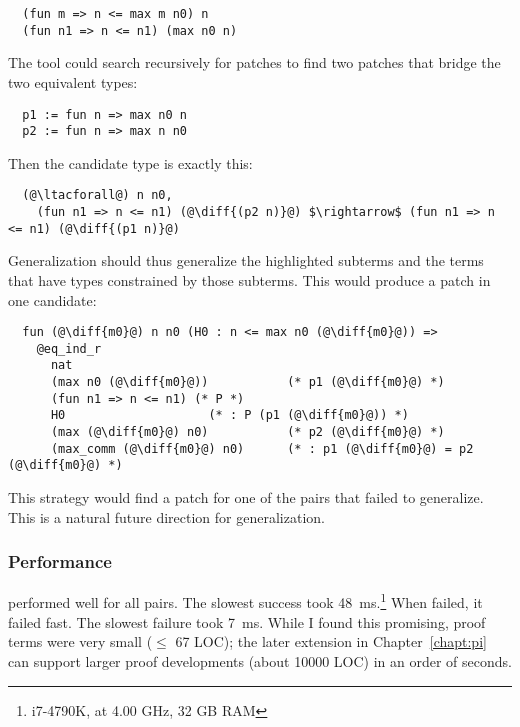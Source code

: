 \begin{lstlisting}
  (fun m => n <= max m n0) n
  (fun n1 => n <= n1) (max n0 n)
\end{lstlisting}
The tool could search recursively for patches to find two patches that bridge the two equivalent
types:

\begin{lstlisting}
  p1 := fun n => max n0 n
  p2 := fun n => max n n0
\end{lstlisting}
Then the candidate type is exactly this:

\begin{lstlisting}
  (@\ltacforall@) n n0,
    (fun n1 => n <= n1) (@\diff{(p2 n)}@) $\rightarrow$ (fun n1 => n <= n1) (@\diff{(p1 n)}@)
\end{lstlisting}
Generalization should thus generalize the highlighted subterms and the
terms that have types constrained by those subterms.
This would produce a patch in one candidate:

\begin{lstlisting}
  fun (@\diff{m0}@) n n0 (H0 : n <= max n0 (@\diff{m0}@)) =>
    @eq_ind_r
      nat
      (max n0 (@\diff{m0}@))           (* p1 (@\diff{m0}@) *)
      (fun n1 => n <= n1) (* P *)
      H0                    (* : P (p1 (@\diff{m0}@)) *)
      (max (@\diff{m0}@) n0)           (* p2 (@\diff{m0}@) *)
      (max_comm (@\diff{m0}@) n0)      (* : p1 (@\diff{m0}@) = p2 (@\diff{m0}@) *)
\end{lstlisting}
This strategy would find a patch for one of the pairs that \sysname failed to generalize.
This is a natural future direction for generalization.

\subsubsection{Performance}
\label{sec:perf}

\sysname performed well for all pairs. The slowest success took \SI{48}{\ms}.\footnote{i7-4790K, at 4.00 GHz, 32 GB RAM}
When \sysname failed, it failed fast. The slowest failure took \SI{7}{\ms}.
While I found this promising, proof terms were very small ($\le$ 67 LOC);
the later \toolnamec extension in Chapter~\ref{chapt:pi} can support larger proof developments (about 10000 LOC) in an order of seconds.


